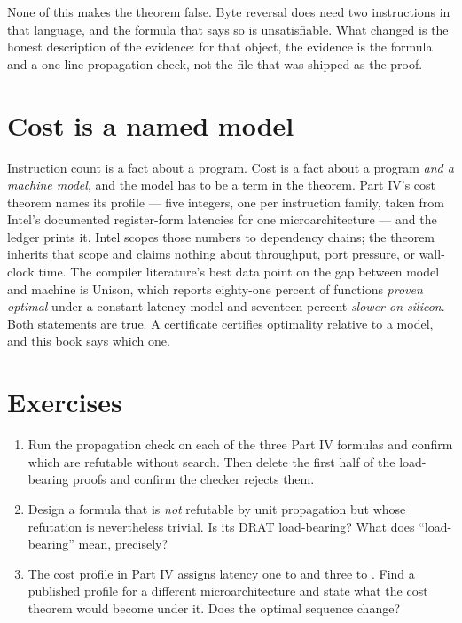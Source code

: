 None of this makes the theorem false. Byte reversal does need two instructions in that language, and the formula that says so is unsatisfiable. What changed is the honest description of the evidence: for that object, the evidence is the formula and a one-line propagation check, not the file that was shipped as the proof.

\section{Cost is a named model}
\label{sec:cost}

Instruction count is a fact about a program. Cost is a fact about a program \emph{and a machine model}, and the model has to be a term in the theorem. Part IV's cost theorem names its profile --- five integers, one per instruction family, taken from Intel's documented register-form latencies for one microarchitecture --- and the ledger prints it. Intel scopes those numbers to dependency chains; the theorem inherits that scope and claims nothing about throughput, port pressure, or wall-clock time. The compiler literature's best data point on the gap between model and machine is Unison, which reports eighty-one percent of functions \emph{proven optimal} under a constant-latency model and seventeen percent \emph{slower on silicon}. Both statements are true. A certificate certifies optimality relative to a model, and this book says which one.

\section{Exercises}

\begin{enumerate}
\item Run the propagation check on each of the three Part IV formulas and confirm which are refutable without search. Then delete the first half of the load-bearing proofs and confirm the checker rejects them.
\item Design a formula that is \emph{not} refutable by unit propagation but whose refutation is nevertheless trivial. Is its DRAT load-bearing? What does \enquote{load-bearing} mean, precisely?
\item The cost profile in Part IV assigns latency one to  and three to . Find a published profile for a different microarchitecture and state what the cost theorem would become under it. Does the optimal sequence change?
\end{enumerate}
